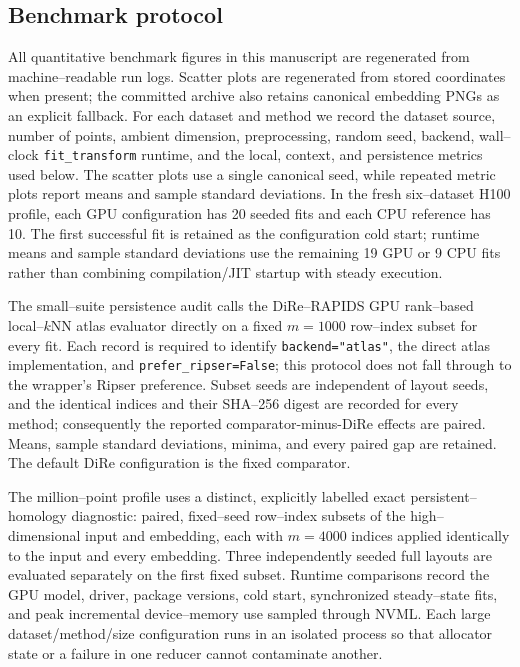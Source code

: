 \documentclass[11pt]{article}
\begin{document}
\subsection{Benchmark protocol}

All quantitative benchmark figures in this manuscript are regenerated from machine--readable run logs. Scatter plots are regenerated from stored coordinates when present; the committed archive also retains canonical embedding PNGs as an explicit fallback. For each dataset and method we record the dataset source, number of points, ambient dimension, preprocessing, random seed, backend, wall--clock \texttt{fit\_transform} runtime, and the local, context, and persistence metrics used below. The scatter plots use a single canonical seed, while repeated metric plots report means and sample standard deviations. In the fresh six--dataset H100 profile, each GPU configuration has 20 seeded fits and each CPU reference has 10. The first successful fit is retained as the configuration cold start; runtime means and sample standard deviations use the remaining 19 GPU or 9 CPU fits rather than combining compilation/JIT startup with steady execution.

The small--suite persistence audit calls the DiRe--RAPIDS GPU rank--based
local--$k$NN atlas evaluator directly on a fixed $m=1000$ row--index subset
for every fit. Each record is required to identify
\texttt{backend="atlas"}, the direct atlas implementation, and
\texttt{prefer\_ripser=False}; this protocol does not fall through to the
wrapper's Ripser preference. Subset seeds are independent of layout seeds, and
the identical indices and their SHA--256 digest are recorded for every method;
consequently the reported comparator-minus-DiRe effects are paired. Means,
sample standard deviations, minima, and every paired gap are retained. The
default DiRe configuration is the fixed comparator.

The million--point profile uses a distinct, explicitly labelled exact persistent--homology diagnostic: \TopologySubsetCount{} paired, fixed--seed row--index subsets of the high--dimensional input and embedding, each with $m=4000$ indices applied identically to the input and every embedding. Three independently seeded full layouts are evaluated separately on the first fixed subset. Runtime comparisons record the GPU model, driver, package versions, cold start, synchronized steady--state fits, and peak incremental device--memory use sampled through NVML. Each large dataset/method/size configuration runs in an isolated process so that allocator state or a failure in one reducer cannot contaminate another.
\end{document}
